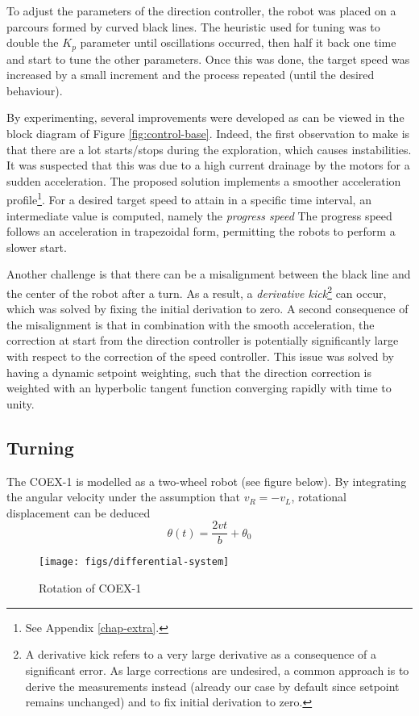 \documentclass[12pt]{report}
\begin{document}
To adjust the parameters of the direction controller, the robot was placed on a parcours formed by curved black lines. The heuristic used for tuning was to double the $K_p$ parameter until oscillations occurred, then half it back one time and start to tune the other parameters. Once this was done, the target speed was increased by a small increment and the process repeated (until the desired behaviour). 

By experimenting, several improvements were developed as can be viewed in the block diagram of Figure \ref{fig:control-base}. Indeed, the first observation to make is that there are a lot starts/stops during the exploration, which causes instabilities. It was suspected that this was due to a high current drainage by the motors for a sudden acceleration. The proposed solution implements a smoother acceleration profile\footnote{See Appendix \ref{chap-extra}.}. For a desired target speed to attain in a specific time interval, an intermediate value is computed, namely the \textit{progress speed} The progress speed follows an acceleration in trapezoidal form, permitting the robots to perform a slower start. 

Another challenge is that there can be a misalignment between the black line and the center of the robot after a turn. As a result, a \textit{derivative kick}\footnote{A derivative kick refers to a very large derivative as a consequence of a significant error. As large corrections are undesired, a common approach is to derive the measurements instead (already our case by default since setpoint remains unchanged) and to fix initial derivation to zero.} can occur, which was solved by fixing the initial derivation to zero. A second consequence of the misalignment is that in combination with the smooth acceleration, the correction at start from the direction controller is potentially significantly large with respect to the correction of the speed controller. This issue was solved by having a dynamic setpoint weighting, such that the direction correction is weighted with an hyperbolic tangent function converging rapidly with time to unity. 

\subsection*{Turning}
The COEX-1 is modelled as a two-wheel robot (see figure below). By integrating the angular velocity under the assumption that $v_R = -v_L$, rotational displacement can be deduced
\begin{equation}\label{eq:theta-turn}
\theta(t) = \frac{2vt}{b} + \theta_0
\end{equation}
\begin{figure}[hbtp]
\centering
\texttt{[image: figs/differential-system]}
\caption{Rotation of COEX-1}
\label{fig:model-turn}
\end{figure}
\end{document}
